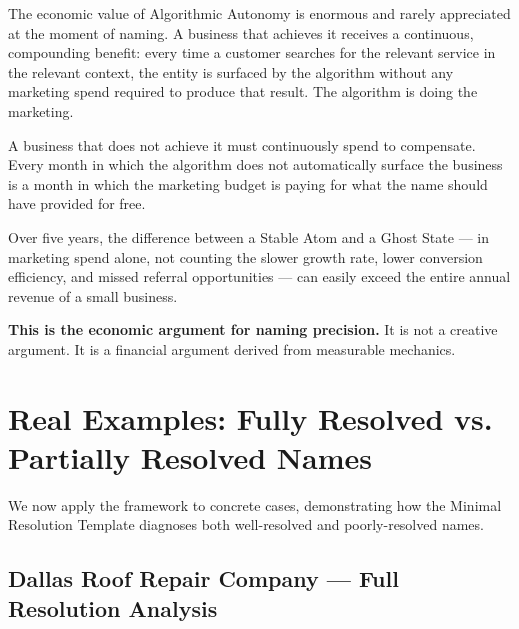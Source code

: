 \documentclass[12pt, openany]{book}
\theoremstyle{thmstyle}
\theoremstyle{defstyle}
\begin{document}
The economic value of Algorithmic Autonomy is enormous and rarely appreciated at the moment of naming. A business that achieves it receives a continuous, compounding benefit: every time a customer searches for the relevant service in the relevant context, the entity is surfaced by the algorithm without any marketing spend required to produce that result. The algorithm is doing the marketing.

A business that does not achieve it must continuously spend to compensate. Every month in which the algorithm does not automatically surface the business is a month in which the marketing budget is paying for what the name should have provided for free.

Over five years, the difference between a Stable Atom and a Ghost State --- in marketing spend alone, not counting the slower growth rate, lower conversion efficiency, and missed referral opportunities --- can easily exceed the entire annual revenue of a small business.

\textbf{This is the economic argument for naming precision.} It is not a creative argument. It is a financial argument derived from measurable mechanics.

\section{Real Examples: Fully Resolved vs. Partially Resolved Names}

We now apply the framework to concrete cases, demonstrating how the Minimal Resolution Template diagnoses both well-resolved and poorly-resolved names.

\subsection{Dallas Roof Repair Company --- Full Resolution Analysis}
\end{document}
